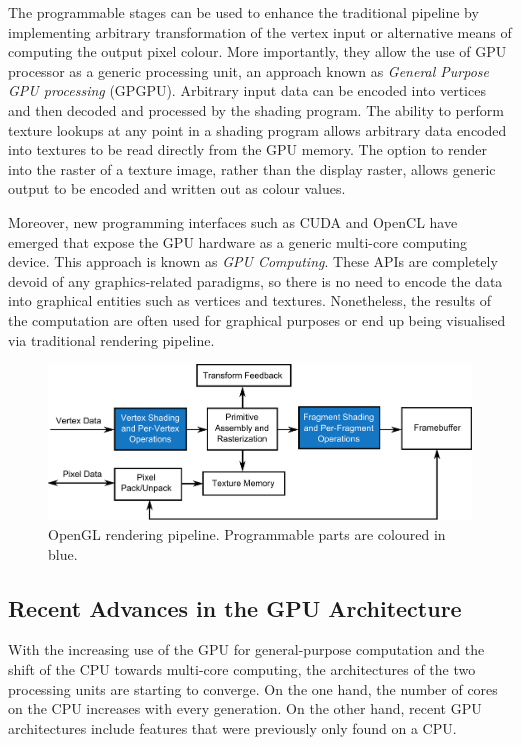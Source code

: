 \documentclass[11pt,a4paper,twoside]{article}
\begin{document}
The programmable stages can be used to enhance the traditional pipeline by implementing arbitrary transformation of the vertex input or alternative means of computing the output pixel colour. More importantly, they allow the use of GPU processor as a generic processing unit, an approach known as \emph{General Purpose GPU processing} (GPGPU). Arbitrary input data can be encoded into vertices and then decoded and processed by the shading program. The ability to perform texture lookups at any point in a shading program allows arbitrary data encoded into textures to be read directly from the GPU memory. The option to render into the raster of a texture image, rather than the display raster, allows generic output to be encoded and written out as colour values.

Moreover, new programming interfaces such as CUDA and OpenCL have emerged that expose the GPU hardware as a generic multi-core computing device. This approach is known as \emph{GPU Computing}. These APIs  are completely devoid of any graphics-related paradigms, so there is no need to encode the data into graphical entities such as vertices and textures. Nonetheless, the results of the computation are often used for graphical purposes or end up being visualised via traditional rendering pipeline.

\begin {figure}
	\centering
	\includegraphics [width=1.0\columnwidth]{figures/gl_pipeline}
	\caption {OpenGL rendering pipeline. Programmable parts are coloured in blue.}
	\label {fig:gl_pipeline}
\end {figure}

\subsection{Recent Advances in the GPU Architecture}

With the increasing use of the GPU for general-purpose computation and the shift of the CPU towards multi-core computing, the architectures of the two processing units are starting to converge. On the one hand, the number of cores on the CPU increases with every generation. On the other hand, recent GPU architectures include features that were previously only found on a CPU.
\end{document}
